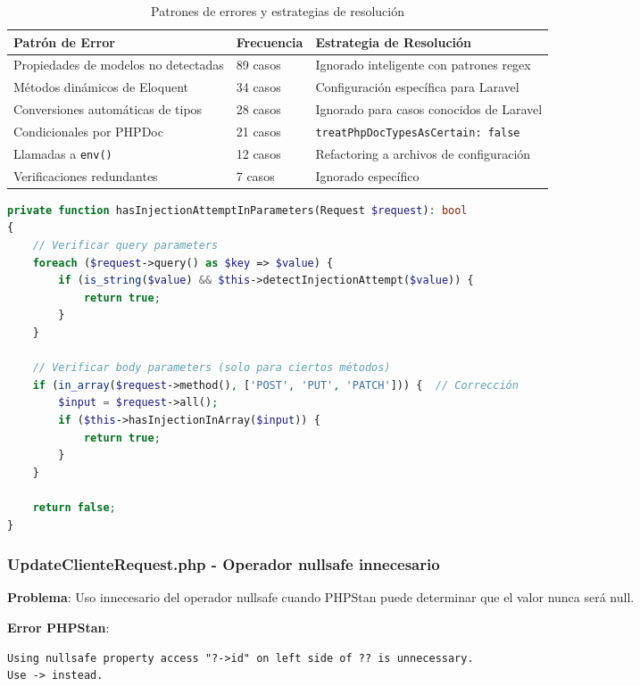 \documentclass[12pt,a4paper]{article}
\begin{document}
\begin{table}[h]
\centering
\begin{tabular}{@{}p{4cm}p{3cm}p{6cm}@{}}
\toprule
\textbf{Patrón de Error} & \textbf{Frecuencia} & \textbf{Estrategia de Resolución} \\
\midrule
Propiedades de modelos no detectadas & 89 casos & Ignorado inteligente con patrones regex \\
Métodos dinámicos de Eloquent & 34 casos & Configuración específica para Laravel \\
Conversiones automáticas de tipos & 28 casos & Ignorado para casos conocidos de Laravel \\
Condicionales por PHPDoc & 21 casos & \texttt{treatPhpDocTypesAsCertain: false} \\
Llamadas a \texttt{env()} & 12 casos & Refactoring a archivos de configuración \\
Verificaciones redundantes & 7 casos & Ignorado específico \\
\bottomrule
\end{tabular}
\caption{Patrones de errores y estrategias de resolución}
\end{table}
\begin{lstlisting}[language=php, caption=SecurityValidator.php - Corrección del método]
private function hasInjectionAttemptInParameters(Request $request): bool
{
    // Verificar query parameters
    foreach ($request->query() as $key => $value) {
        if (is_string($value) && $this->detectInjectionAttempt($value)) {
            return true;
        }
    }

    // Verificar body parameters (solo para ciertos métodos)
    if (in_array($request->method(), ['POST', 'PUT', 'PATCH'])) {  // Corrección
        $input = $request->all();
        if ($this->hasInjectionInArray($input)) {
            return true;
        }
    }

    return false;
}
\end{lstlisting}

\subsubsection{UpdateClienteRequest.php - Operador nullsafe innecesario}

\textbf{Problema}: Uso innecesario del operador nullsafe cuando PHPStan puede determinar que el valor nunca será null.

\textbf{Error PHPStan}:
\begin{lstlisting}[caption=Error en UpdateClienteRequest.php]
Using nullsafe property access "?->id" on left side of ?? is unnecessary.
Use -> instead.
\end{lstlisting}
\end{document}
